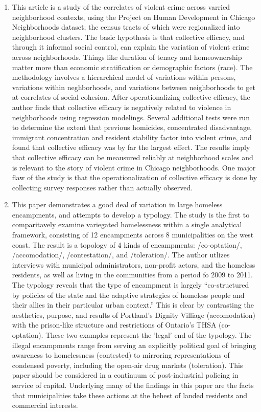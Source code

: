 \documentclass{article}
\begin{document}
\begin{enumerate}
\item \cite{sampson1997NeighborhoodsViolent}

This article is a study of the correlates of violent crime across
varried neighborhood contexts, using the Project on Human Development
in Chicago Neighborhoods dataset; the census tracts of which were
regionalized into neighborhood clusters. The basic hypothesis is that
collective efficacy, and through it informal social control, can
explain the variation of violent crime across neighborhoods. Things
like duration of tenacy and homeownership matter more than economic
stratification or demographic factors (race). The methodology involves
a hierarchical model of variations within persons, variations within
neghborhoods, and variations between neighborhoods to get at
correlates of social cohesion. After operationalizing collective
efficacy, the author finds that collective efficacy is negatively
related to violence in neighborhoods using regression
modelings. Several additional tests were run to determine the extent
that previous homicides, concentrated disadvantage, immigrant
concentration and resident stability factor into violent crime, and
found that collective efficacy was by far the largest effect. The
results imply that collective efficacy can be meausured reliably at
neighborhood scales and is relevant to the story of violent crime in
Chicago neighborhoods. One major flaw of the study is that the
operationalization of collective efficacy is done by collecting survey
responses rather than actually observed.

\item \cite{herring2014NewLogics}
  
This paper demonstrates a good deal of variation in large homeless
encampments, and attempts to develop a typology. The study is the
first to comparitavely examine variegated homelessness within a single
analytical framework, consisting of 12 encampments across 8
municipalities on the west coast. The result is a topology of 4 kinds
of encampments: /co-optation/, /accomodation/, /contestation/, and
/toleration/. The author utlizes interviews with municipal
administrators, non-profit actors, and the homeless residents, as well
as living in the communities from a period fo 2009 to 2011. The
typology reveals that the type of encampment is largely
``co-structured by policies of the state and the adaptive strategies
of homeless people and their allies in their particular urban
context.'' This is clear by contrasting the aesthetics, purpose, and
results of Portland's Dignity Villiage (accomodation) with the
prison-like structure and restrictions of Ontario's THSA
(co-optation). These two examples represent the 'legal' end of the
typology. The illegal encampments range from serving an explicitly
political goal of bringing awareness to homelessness (contested) to
mirroring representations of condensed poverty, including the open-air
drug markets (toleration). This paper should be considered in a
continuum of post-industrial policing in service of
capital. Underlying many of the findings in this paper are the facts
that municipalities take these actions at the behest of landed
residents and commercial interests.


\end{enumerate}
\end{document}
